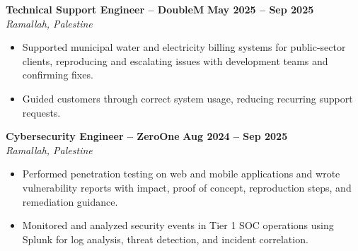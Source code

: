 \documentclass[10pt]{article}
\newcommand{\role}[3]{\textbf{#1} \hfill \textbf{#3}\\{\small\itshape #2}\par}
\begin{document}
\role{Technical Support Engineer -- DoubleM}{Ramallah, Palestine}{May 2025 -- Sep 2025}
\begin{itemize}
\item Supported municipal water and electricity billing systems for public-sector clients, reproducing and escalating issues with development teams and confirming fixes.
\item Guided customers through correct system usage, reducing recurring support requests.
\end{itemize}

\role{Cybersecurity Engineer -- ZeroOne}{Ramallah, Palestine}{Aug 2024 -- Sep 2025}
\begin{itemize}
\item Performed penetration testing on web and mobile applications and wrote vulnerability reports with impact, proof of concept, reproduction steps, and remediation guidance.
\item Monitored and analyzed security events in Tier 1 SOC operations using Splunk for log analysis, threat detection, and incident correlation.
\end{itemize}
\end{document}
